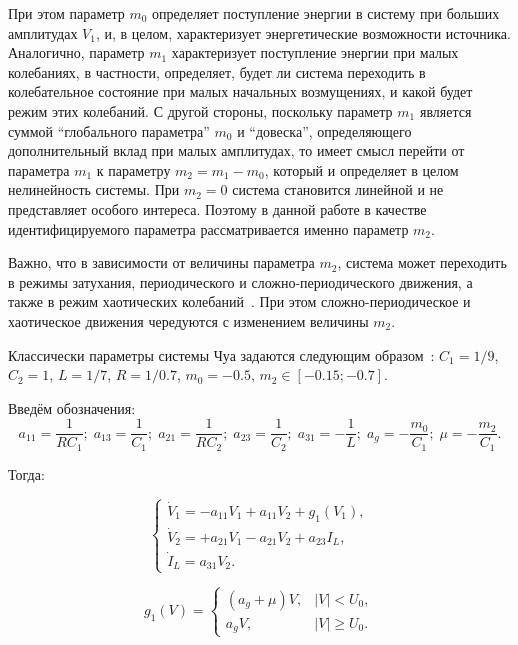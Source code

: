 При этом параметр \(m_0\) определяет поступление энергии в систему
при больших амплитудах \(V_1\), и, в целом, характеризует
энергетические возможности источника.
Аналогично, параметр \(m_1\) характеризует поступление энергии
при малых колебаниях, в частности, определяет, будет ли
система переходить в колебательное состояние при малых начальных
возмущениях, и какой будет режим этих колебаний.
С другой стороны, поскольку параметр \(m_1\) является суммой
``глобального параметра'' \(m_0\) и ``довеска'',
определяющего дополнительный вклад при малых амплитудах,
то имеет смысл перейти от параметра \(m_1\) к параметру
\( m_2 = m_1 - m_0 \), который
и определяет в целом нелинейность
системы. При \( m_2 = 0 \) система становится линейной
и не представляет особого интереса. Поэтому
в данной работе в качестве
идентифицируемого параметра рассматривается именно параметр \(m_2\).

Важно, что в зависимости от величины параметра $m_2$,
система может переходить в режимы затухания,
периодического и сложно-периодического движения, а также в режим
хаотических колебаний~\cite{anisch_nonlin_eff,magni_new_meth}. При этом сложно-периодическое и хаотическое
движения чередуются с изменением величины \(m_2\).


Классически параметры системы Чуа задаются следующим образом~\cite{buga_chua}:
$C_1 = 1/9$, $C_2 = 1$, $L= 1/7$, $R = 1/0.7$, $m_0=-0.5$, $ m_2 \in [ -0.15; -0.7 ] $.

Введём обозначения:
\[
  a_{11} = \frac{1}{R C_1}; \;
  a_{13} = \frac{1}{C_1}; \;
  a_{21} = \frac{1}{R C_2}; \;
  a_{23} = \frac{1}{C_2}; \;
  a_{31} = -\frac{1}{L}; \;
  a_g = - \frac{m_0}{C_1}; \;
  \mu = - \frac{m_2}{C_1}.
\]

\noindent
Тогда:

\begin{equation}
\begin{cases}
  \dot{V}_1  = -a_{11} V_1 + a_{11}  V_2  + g_1(V_1) , \\
  \dot{V}_2  = +a_{21} V_1 - a_{21}  V_2  + a_{23} I_L    , \\
  \dot{I}_L  =  a_{31} V_2.
\end{cases}
\label{atu:eq:chua2}
\end{equation}


\begin{equation}
g_1(V) =
\begin{cases}
  ( a_g + \mu ) V , & |V| <   U_0, \\
  a_g V           , & |V| \ge U_0.
\end{cases}
\label{atu:eq:diodchua2}
\end{equation}

